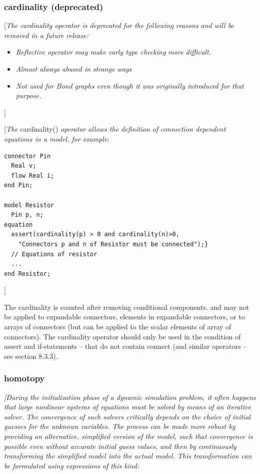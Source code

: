 \documentclass[10pt,a4paper]{report}
\def\doublelabel#1{\label{#1}\hypertarget{#1}{}}
\begin{document}
\subsubsection{cardinality (deprecated)}\doublelabel{cardinality-deprecated}

{[}\emph{The cardinality operator is deprecated for the following
reasons and will be removed in a future release:}

\begin{itemize}
\item
  \emph{Reflective operator may make early type checking more difficult.}
\item
  \emph{Almost always abused in strange ways}
\item
  \emph{Not used for Bond graphs even though it was originally introduced for that purpose.}
\end{itemize}
{]}

{[}\emph{The} cardinality() \emph{operator allows the definition of
connection dependent equations in a model, for example}:
\begin{lstlisting}[language=modelica]
connector Pin
  Real v;
  flow Real i;
end Pin;

model Resistor
  Pin p, n;
equation
  assert(cardinality(p) > 0 and cardinality(n)>0,
    "Connectors p and n of Resistor must be connected");}
  // Equations of resistor
  ...
end Resistor;
\end{lstlisting}
{]}

The cardinality is counted after removing conditional components. and
may not be applied to expandable connectors, elements in expandable
connectors, or to arrays of connectors (but can be applied to the scalar
elements of array of connectors). The cardinality operator should only
be used in the condition of assert and if-statements -- that do not
contain connect (and similar operators -- see section 8.3.3).

\subsubsection{homotopy}\doublelabel{homotopy}

\emph{{[}During the initialization phase of a dynamic simulation
problem, it often happens that large nonlinear systems of equations must
be solved by means of an iterative solver. The convergence of such
solvers critically depends on the choice of initial guesses for the
unknown variables. The process can be made more robust by providing an
alternative, simplified version of the model, such that convergence is
possible even without accurate initial guess values, and then by
continuously transforming the simplified model into the actual model.
This transformation can be formulated using expressions of this kind:}
\end{document}
